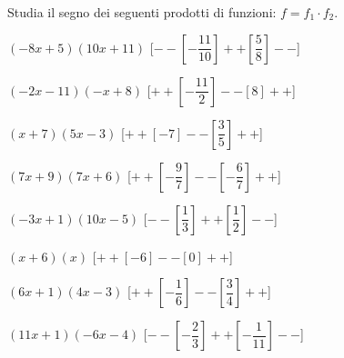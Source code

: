 \begin{esercizio}\label{ese:dis_5}
 Studia il segno dei seguenti prodotti di funzioni: \(f = f_1 \cdot f_2\).
 \begin{enumeratea}
  \item  \(\left(-8 x +5\right)\left(10 x +11\right)\) \hfill 
  [\(--\left [-\dfrac{11}{10} \right ]++\left [\dfrac{5}{8} \right ]--\)]
  \item  \(\left(-2 x -11\right)\left(- x +8\right)\) \hfill 
  [\(++\left [-\dfrac{11}{2} \right ]--\left [8 \right ]++\)]
  \item  \(\left(x +7\right)\left(5 x -3\right)\) \hfill 
  [\(++\left [-7 \right ]--\left [\dfrac{3}{5} \right ]++\)]
  \item  \(\left(7 x +9\right)\left(7 x +6\right)\) \hfill 
  [\(++\left [-\dfrac{9}{7} \right ]--\left [-\dfrac{6}{7} \right ]++\)]
  \item  \(\left(-3 x +1\right)\left(10 x -5\right)\) \hfill 
  [\(--\left [\dfrac{1}{3} \right ]++\left [\dfrac{1}{2} \right ]--\)]
  \item  \(\left(x +6\right)\left(x \right)\) \hfill 
  [\(++\left [-6 \right ]--\left [0 \right ]++\)]
  \item  \(\left(6 x +1\right)\left(4 x -3\right)\) \hfill 
  [\(++\left [-\dfrac{1}{6} \right ]--\left [\dfrac{3}{4} \right ]++\)]
  \item  \(\left(11 x +1\right)\left(-6 x -4\right)\) \hfill 
  [\(--\left [-\dfrac{2}{3} \right ]++\left [-\dfrac{1}{11} \right ]--\)]
 \end{enumeratea}
\end{esercizio}

